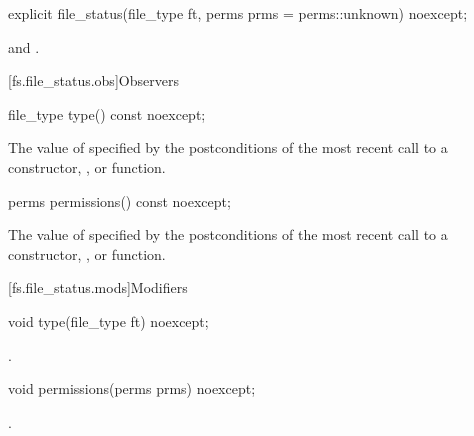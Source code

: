 %
\begin{itemdecl}
explicit file_status(file_type ft, perms prms = perms::unknown) noexcept;
\end{itemdecl}

\begin{itemdescr}
\pnum
\ensures {} and .
\end{itemdescr}

[fs.file_status.obs]{Observers}

%
\begin{itemdecl}
file_type type() const noexcept;
\end{itemdecl}

\begin{itemdescr}
\pnum
\returns The value of  specified by the postconditions of the most recent call to a constructor,
  , or  function.
\end{itemdescr}

%
\begin{itemdecl}
perms permissions() const noexcept;
\end{itemdecl}

\begin{itemdescr}
\pnum
\returns The value of  specified by the postconditions of the most recent call to a constructor,
  , or  function.
\end{itemdescr}

[fs.file_status.mods]{Modifiers}

%
\begin{itemdecl}
void type(file_type ft) noexcept;
\end{itemdecl}

\begin{itemdescr}
\pnum
\ensures {}.
\end{itemdescr}

%
\begin{itemdecl}
void permissions(perms prms) noexcept;
\end{itemdecl}

\begin{itemdescr}
\pnum
\ensures {}.
\end{itemdescr}

